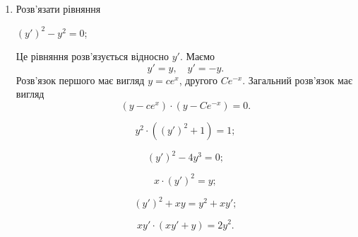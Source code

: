 \begin{enumerate}
\item Розв’язати рівняння
\begin{example}
	$(y')^2 - y^2 = 0$;
\end{example}
\begin{solution}
	Це рівняння розв’язується відносно $y'$. Маємо  \[y' = y, \quad y' = - y.\] Розв’язок першого має вигляд $y = ce^x$, другого $Ce^{-x}$. Загальний розв’язок має вигляд \[ (y - ce^x)\cdot(y-Ce^{-x})=0.\]
\end{solution}
\begin{multicols}{2}
\begin{problem}
	\[y^2\cdot((y')^2+1)=1;\]
\end{problem}
\begin{problem}
	\[(y')^2-4y^3=0;\]
\end{problem}
\begin{problem}
	\[x\cdot(y')^2=y;\]
\end{problem}
\begin{problem}
	\[(y')^2+xy=y^2+xy';\]
\end{problem}
\begin{problem}
	\[xy'\cdot(xy'+y)=2y^2.\]
\end{problem}
\end{multicols}
\end{enumerate}
